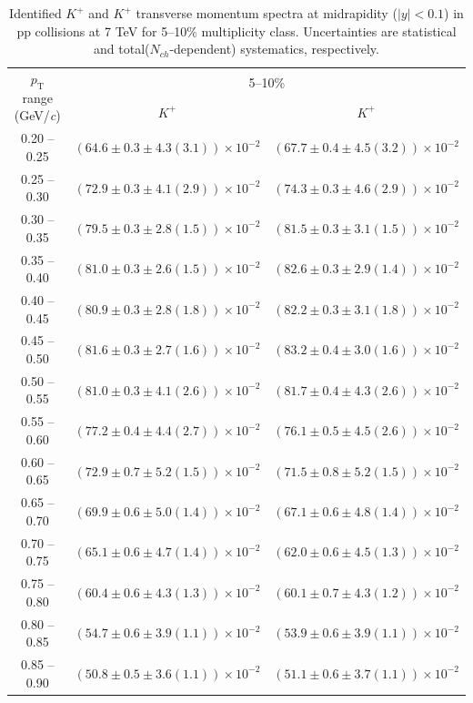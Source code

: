 \begin{table}
\caption{Identified $K^{+}$ and $K^{+}$  transverse momentum spectra at midrapidity ($|y|<0.1$) in pp collisions at 7 TeV for 5--10\% multiplicity class. Uncertainties are statistical and total($N_{ch}$-dependent) systematics, respectively.}
\label{tab:KaonPlus_KaonMinus_5to10}
\begin{center}
\begin{tabular}{ c | c c }
\hline
\multirow{2}{*}{$p_{\mathrm{T}}$ range (GeV/\textit{c})} & \multicolumn{2}{c}{5--10\%} \\ & $K^{+}$& $K^{+}$\\ 
\hline
0.20 -- 0.25 & $(64.6\pm0.3\pm4.3(3.1))\times10^{-2}$ & $(67.7\pm0.4\pm4.5(3.2))\times10^{-2}$ \\ 
0.25 -- 0.30 & $(72.9\pm0.3\pm4.1(2.9))\times10^{-2}$ & $(74.3\pm0.3\pm4.6(2.9))\times10^{-2}$ \\ 
0.30 -- 0.35 & $(79.5\pm0.3\pm2.8(1.5))\times10^{-2}$ & $(81.5\pm0.3\pm3.1(1.5))\times10^{-2}$ \\ 
0.35 -- 0.40 & $(81.0\pm0.3\pm2.6(1.5))\times10^{-2}$ & $(82.6\pm0.3\pm2.9(1.4))\times10^{-2}$ \\ 
0.40 -- 0.45 & $(80.9\pm0.3\pm2.8(1.8))\times10^{-2}$ & $(82.2\pm0.3\pm3.1(1.8))\times10^{-2}$ \\ 
0.45 -- 0.50 & $(81.6\pm0.3\pm2.7(1.6))\times10^{-2}$ & $(83.2\pm0.4\pm3.0(1.6))\times10^{-2}$ \\ 
0.50 -- 0.55 & $(81.0\pm0.3\pm4.1(2.6))\times10^{-2}$ & $(81.7\pm0.4\pm4.3(2.6))\times10^{-2}$ \\ 
0.55 -- 0.60 & $(77.2\pm0.4\pm4.4(2.7))\times10^{-2}$ & $(76.1\pm0.5\pm4.5(2.6))\times10^{-2}$ \\ 
0.60 -- 0.65 & $(72.9\pm0.7\pm5.2(1.5))\times10^{-2}$ & $(71.5\pm0.8\pm5.2(1.5))\times10^{-2}$ \\ 
0.65 -- 0.70 & $(69.9\pm0.6\pm5.0(1.4))\times10^{-2}$ & $(67.1\pm0.6\pm4.8(1.4))\times10^{-2}$ \\ 
0.70 -- 0.75 & $(65.1\pm0.6\pm4.7(1.4))\times10^{-2}$ & $(62.0\pm0.6\pm4.5(1.3))\times10^{-2}$ \\ 
0.75 -- 0.80 & $(60.4\pm0.6\pm4.3(1.3))\times10^{-2}$ & $(60.1\pm0.7\pm4.3(1.2))\times10^{-2}$ \\ 
0.80 -- 0.85 & $(54.7\pm0.6\pm3.9(1.1))\times10^{-2}$ & $(53.9\pm0.6\pm3.9(1.1))\times10^{-2}$ \\ 
0.85 -- 0.90 & $(50.8\pm0.5\pm3.6(1.1))\times10^{-2}$ & $(51.1\pm0.6\pm3.7(1.1))\times10^{-2}$ \\ 

\end{tabular}
\end{center}
\end{table}
